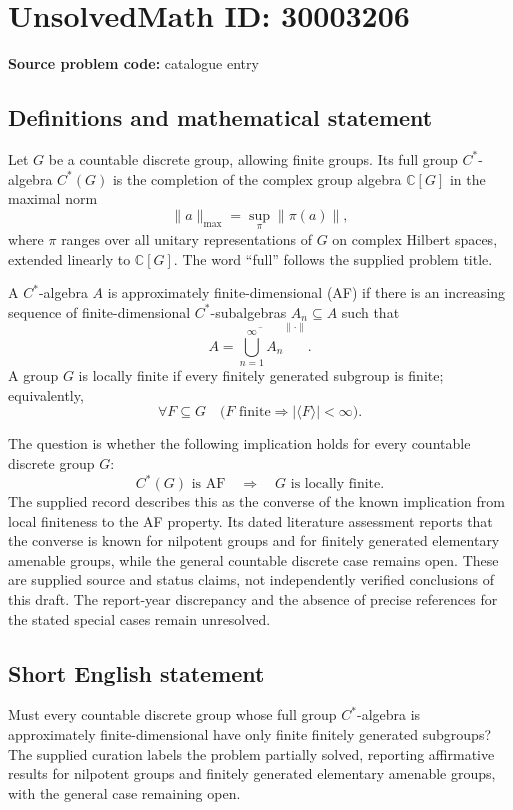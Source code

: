 \documentclass[11pt]{article}
\newcommand{\C}{\mathbb{C}}
\begin{document}
\section*{UnsolvedMath ID: 30003206}
\textbf{Source problem code:} catalogue entry
\subsection{Definitions and mathematical statement}
Let \(G\) be a countable discrete group, allowing finite groups. Its full group \(C^*\)-algebra \(C^*(G)\) is the completion of the complex group algebra \(\C[G]\) in the maximal norm
\[
\|a\|_{\max}=\sup_{\pi}\|\pi(a)\|,
\]
where \(\pi\) ranges over all unitary representations of \(G\) on complex Hilbert spaces, extended linearly to \(\C[G]\). The word ``full'' follows the supplied problem title.

A \(C^*\)-algebra \(A\) is approximately finite-dimensional (AF) if there is an increasing sequence of finite-dimensional \(C^*\)-subalgebras \(A_n\subseteq A\) such that
\[
A=\overline{\bigcup_{n=1}^{\infty}A_n}^{\|\cdot\|}.
\]
A group \(G\) is locally finite if every finitely generated subgroup is finite; equivalently,
\[
\forall F\subseteq G\quad
\bigl(F\text{ finite}\Longrightarrow |\langle F\rangle|<\infty\bigr).
\]

The question is whether the following implication holds for every countable discrete group \(G\):
\[
C^*(G)\text{ is AF}
\quad\Longrightarrow\quad
G\text{ is locally finite}.
\]
The supplied record describes this as the converse of the known implication from local finiteness to the AF property. Its dated literature assessment reports that the converse is known for nilpotent groups and for finitely generated elementary amenable groups, while the general countable discrete case remains open. These are supplied source and status claims, not independently verified conclusions of this draft. The report-year discrepancy and the absence of precise references for the stated special cases remain unresolved.
\subsection{Short English statement}
Must every countable discrete group whose full group \(C^*\)-algebra is approximately finite-dimensional have only finite finitely generated subgroups? The supplied curation labels the problem partially solved, reporting affirmative results for nilpotent groups and finitely generated elementary amenable groups, with the general case remaining open.
\end{document}
